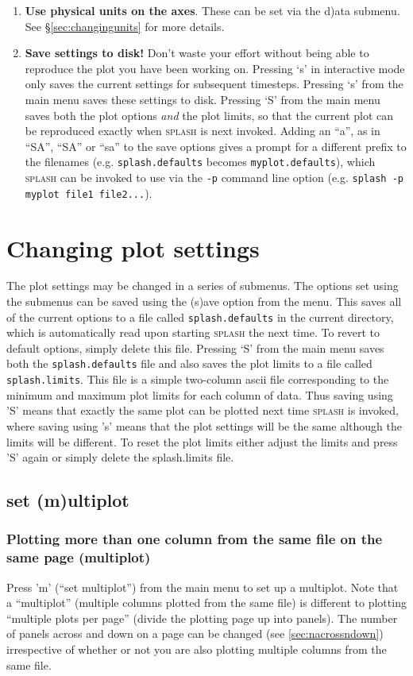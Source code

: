 \documentclass[a4paper,10pt]{article}
\newcommand{\splash}{\textsc{splash }}
\begin{document}
\begin{enumerate}
\item {\bf Use physical units on the axes}. These can be set via the d)ata submenu. See \S\ref{sec:changingunits} for more details.
\item {\bf Save settings to disk!} Don't waste your effort without being able to reproduce the plot you have been working on. Pressing `s' in interactive mode only saves the current settings for subsequent timesteps. Pressing `s' from the main menu saves these settings to disk. Pressing `S' from the main menu saves both the plot options \emph{and} the plot limits, so that the current plot can be reproduced exactly when \splash is next invoked. Adding an ``a'', as in ``SA'', ``SA'' or ``sa'' to the save options gives a prompt for a different prefix to the filenames (e.g. \verb+splash.defaults+ becomes \verb+myplot.defaults+), which \splash can be invoked to use via the \verb+-p+ command line option (e.g. \verb+splash -p myplot file1 file2...+).
\end{enumerate}

\section{Changing plot settings}%
 The plot settings may be changed in a series of submenus. The options set using
the submenus can be saved using the (s)ave option from the menu. This saves all of
the current options to a file called \verb+splash.defaults+ in the current directory, which is
automatically read upon starting \splash the next time. To revert to default options, simply delete this file.
Pressing `S' from the main menu saves both the \verb+splash.defaults+ file and also saves the plot limits to a file called \verb+splash.limits+. This file is a simple two-column ascii file corresponding to the minimum and maximum plot limits for each column of data. Thus saving using 'S' means that exactly the same plot can be plotted next time \splash is invoked, where saving using 's' means that the plot settings will be the same although the limits will be different. To reset the plot limits either adjust the limits and press 'S' again or simply delete the splash.limits file.

\subsection{set (m)ultiplot}%
\label{sec:multiplot}
\subsubsection{ Plotting more than one column from the same file on the same page (multiplot)}
\label{sec:multiplotsetup}
 Press 'm'  (``set multiplot'') from the main menu to set up a multiplot. Note that a ``multiplot'' (multiple columns plotted from the same file) is different to plotting ``multiple plots per page'' (divide the plotting page up into panels). The number of panels across and down on a page can be changed (see \ref{sec:nacrossndown}) irrespective of whether or not you are also plotting multiple columns from the same file.
\end{document}
